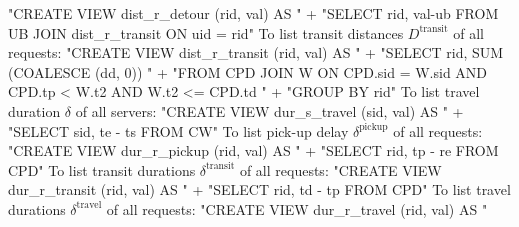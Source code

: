 "CREATE VIEW dist_r_detour (rid, val) AS "
  + "SELECT rid, val-ub FROM UB JOIN dist_r_transit ON uid = rid"
\nwendcode{}\nwdocspar
To list transit distances $D^\textrm{transit}$ of all requests:
\nwenddocs{}\endmoddef{}
"CREATE VIEW dist_r_transit (rid, val) AS "
  + "SELECT rid, SUM (COALESCE (dd, 0)) "
  + "FROM CPD JOIN W ON CPD.sid = W.sid AND CPD.tp < W.t2 AND W.t2 <= CPD.td "
  + "GROUP BY rid"
\nwendcode{}\nwdocspar
To list travel duration $\delta$ of all servers:
\nwenddocs{}\endmoddef{}
"CREATE VIEW dur_s_travel (sid, val) AS "
  + "SELECT sid, te - ts FROM CW"
\nwendcode{}\nwdocspar
To list pick-up delay $\delta^\textrm{pickup}$ of all requests:
\nwenddocs{}\endmoddef{}
"CREATE VIEW dur_r_pickup (rid, val) AS "
  + "SELECT rid, tp - re FROM CPD"
\nwendcode{}\nwdocspar
To list transit durations $\delta^\textrm{transit}$ of all requests:
\nwenddocs{}\endmoddef{}
"CREATE VIEW dur_r_transit (rid, val) AS "
  + "SELECT rid, td - tp FROM CPD"
\nwendcode{}\nwdocspar
To list travel durations $\delta^\textrm{travel}$ of all requests:
\nwenddocs{}\endmoddef{}
"CREATE VIEW dur_r_travel (rid, val) AS "
